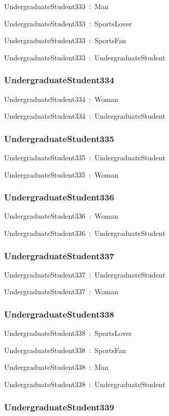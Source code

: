 \documentclass{article}
\begin{document}
UndergraduateStudent333~:~Man

UndergraduateStudent333~:~SportsLover

UndergraduateStudent333~:~SportsFan

UndergraduateStudent333~:~UndergraduateStudent

\subsubsection*{UndergraduateStudent334}

UndergraduateStudent334~:~Woman

UndergraduateStudent334~:~UndergraduateStudent

\subsubsection*{UndergraduateStudent335}

UndergraduateStudent335~:~UndergraduateStudent

UndergraduateStudent335~:~Woman

\subsubsection*{UndergraduateStudent336}

UndergraduateStudent336~:~Woman

UndergraduateStudent336~:~UndergraduateStudent

\subsubsection*{UndergraduateStudent337}

UndergraduateStudent337~:~UndergraduateStudent

UndergraduateStudent337~:~Woman

\subsubsection*{UndergraduateStudent338}

UndergraduateStudent338~:~SportsLover

UndergraduateStudent338~:~SportsFan

UndergraduateStudent338~:~Man

UndergraduateStudent338~:~UndergraduateStudent

\subsubsection*{UndergraduateStudent339}
\end{document}

